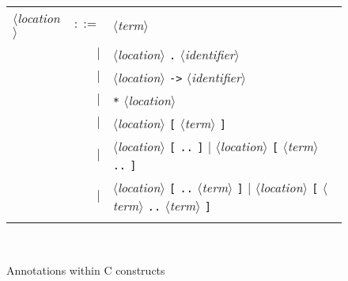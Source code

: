 \documentclass[12pt,a4paper,twoside,openright]{report}
\newcommand{\te}[1]{\texttt{#1}}
\newcommand{\nt}[1]{$\langle$\textsl{#1}$\rangle$}
\begin{document}
\begin{figure}[htbp]
\begin{center}
\begin{tabular}{lrl}
  \nt{location}
    & $::=$ & \nt{term} \\
    &   $|$ & \nt{location} \te{.} \nt{identifier} \\
    &   $|$ & \nt{location} \te{->} \nt{identifier} \\
    &   $|$ & \te{*} \nt{location} \\
    &   $|$ & \nt{location} \te{[} \nt{term} \te{]} \\
    &   $|$ & \nt{location} \te{[} \te{..} \te{]} $|$
              \nt{location} \te{[} \nt{term} \te{..} \te{]} \\
    &   $|$ & \nt{location} \te{[} \te{..} \nt{term} \te{]} $|$
              \nt{location} \te{[} \nt{term} \te{..} \nt{term} \te{]} \\
  \\[0.1em]
\end{tabular}\\
\hrulefill
\caption{Annotations within C constructs}
\label{fig:cfiles}
\end{center}           
\end{figure}
\end{document}
